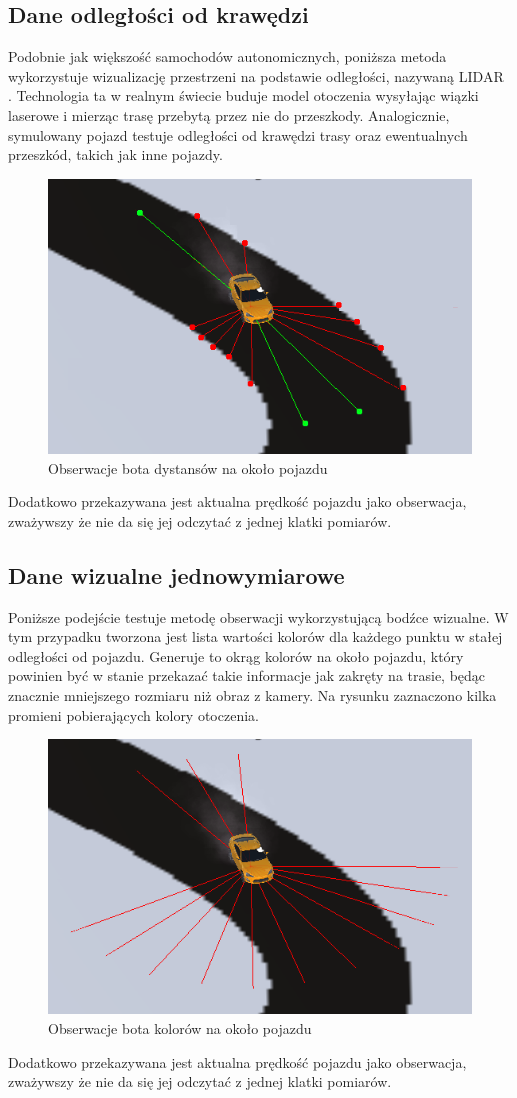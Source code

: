 \subsection{Dane odległości od krawędzi}
Podobnie jak większość samochodów autonomicznych, poniższa metoda wykorzystuje wizualizację przestrzeni na podstawie odległości, nazywaną LIDAR \cite{Lidar}. Technologia ta w realnym świecie buduje model otoczenia wysyłając wiązki laserowe i mierząc trasę przebytą przez nie do przeszkody. Analogicznie, symulowany pojazd testuje odległości od krawędzi trasy oraz ewentualnych przeszkód, takich jak inne pojazdy.
\begin{figure}[H]
    \centering
    \includegraphics[width=.5\textwidth]{figures/observations_0}
    \caption{Obserwacje bota dystansów na około pojazdu}
    \label{fig}
\end{figure}
Dodatkowo przekazywana jest aktualna prędkość pojazdu jako obserwacja, zważywszy że nie da się jej odczytać z jednej klatki pomiarów.

\subsection{Dane wizualne jednowymiarowe}
Poniższe podejście testuje metodę obserwacji wykorzystującą bodźce wizualne. W tym przypadku tworzona jest lista wartości kolorów dla każdego punktu w stałej odległości od pojazdu. Generuje to okrąg kolorów na około pojazdu, który powinien być w stanie przekazać takie informacje jak zakręty na trasie, będąc znacznie mniejszego rozmiaru niż obraz z kamery. Na rysunku zaznaczono kilka promieni pobierających kolory otoczenia.
\begin{figure}[H]
    \centering
    \includegraphics[width=.5\textwidth]{figures/observations_1}
    \caption{Obserwacje bota kolorów na około pojazdu}
    \label{fig}
\end{figure}
Dodatkowo przekazywana jest aktualna prędkość pojazdu jako obserwacja, zważywszy że nie da się jej odczytać z jednej klatki pomiarów.

